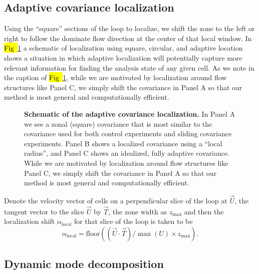 \documentclass[10pt,letterpaper]{article}
\begin{document}
\subsection*{Adaptive covariance localization}

Using the ``square'' sections of the loop to localize, we shift the zone to the left or right to follow the dominate flow direction at the center of that local window.
In \hl{Fig~}\ref{fig:covariance-localization-schematic} a schematic of localization using square, circular, and adaptive location shows a situation in which adaptive localization will potentially capture more relevant information for finding the analysis state of any given cell.
As we note in the caption of \hl{Fig~}\ref{fig:covariance-localization-schematic}, while we are motivated by localization around flow structures like Panel C, we simply shift the covariance in Panel A so that our method is most general and computationally efficient.

\begin{figure}[h]
  \centering
  \caption[]{
\textbf{    Schematic of the adaptive covariance localization.
}    In Panel A we see a zonal (square) covariance that is most similar to the covariance used for both control experiments and sliding covariance experiments.
    Panel B shows a localized covariance using a ``local radius'', and Panel C shows an idealized, fully adaptive covariance.
    While we are motivated by localization around flow structures like Panel C, we simply shift the covariance in Panel A so that our method is most general and computationally efficient.
  }
  \label{fig:covariance-localization-schematic}
\end{figure}

Denote the velocity vector of cells on a perpendicular slice of the loop at $\vec{U}$, the tangent vector to the slice $\vec{U}$ by $\vec{T}$, the zone width as $z_{\text{max}}$ and then the localization shift $\alpha_{\text{local}}$ for that slice of the loop is taken to be
\begin{equation} \alpha_{\text{local}} = \text{floor} \left( (\vec{U} \cdot \vec{T})/\max (U) \times z_{\text{max}} \right) . \end{equation}

\subsection*{Dynamic mode decomposition}
\end{document}
